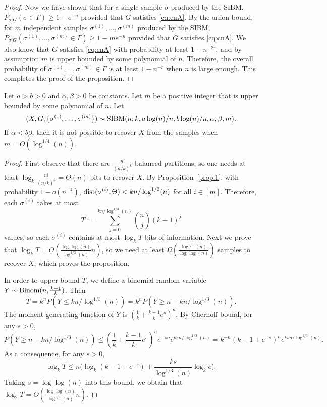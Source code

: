\documentclass{article}
\begin{document}
\begin{proof}
Now we have shown that for a single sample $\sigma$ produced by the SIBM, $P_{\sigma|G}(\sigma\in\Gamma)\ge 1- e^{-n}$ provided that $G$ satisfies \eqref{eq:cnA}. By the union bound, for $m$ independent samples $\sigma^{(1)},\dots,\sigma^{(m)}$ produced by the SIBM, $P_{\sigma|G}(\sigma^{(1)},\dots,\sigma^{(m)}\in\Gamma)\ge 1- m e^{-n}$ provided that $G$ satisfies \eqref{eq:cnA}.
We also know that $G$ satisfies \eqref{eq:cnA} with probability at least $1-n^{-2r}$, and by assumption $m$ is upper bounded by some polynomial of $n$. Therefore, the overall probability of $\sigma^{(1)},\dots,\sigma^{(m)}\in\Gamma$ is at least $1-n^{-r}$ when $n$ is large enough. This completes the proof of the proposition.
\end{proof}
\begin{proposition}  \label{prop:ab}
Let $a>b>0$ and $\alpha,\beta>0$ be constants. Let $m$ be a positive integer that is upper bounded by some polynomial of $n$.
Let 
$$
(X,G,\{\sigma^{(1)},\dots,\sigma^{(m)}\})\sim \operatorname{SIBM}(n,k, a\log(n)/n, b\log(n)/n,\alpha,\beta, m) .
$$
If $\alpha<b\beta$, then it is not possible to recover $X$ from the samples when $m=O(\log^{1/4}(n))$.
\end{proposition}

\begin{proof}
First observe that there are $\frac{n!}{(n/k)^k}$ balanced partitions, so one needs at least $\log_k \frac{n!}{(n/k)^k}=\Theta(n)$ bits to recover $X$.
By Proposition~\ref{prop:1}, with probability $1-o(n^{-4})$, $\operatorname{dist}(\sigma^{(i)}, \Theta)< kn/\log^{1/3}(n)$
for all $i\in[m]$. Therefore, each $\sigma^{(i)}$ takes at most
$$
T:=\sum_{j=0}^{kn/\log^{1/3}(n)} \binom{n}{j}(k-1)^j
$$
values, so each $\sigma^{(i)}$ contains at most $\log_k T$ bits of information. Next we prove that $\log_k T=O(\frac{\log\log(n)}{\log^{1/3}(n)} n)$, so we need at least $\Omega(\frac{\log^{1/3}(n)}{\log\log(n)})$ samples to recover $X$, which proves the proposition.

In order to upper bound $T$, we define a binomial random variable $Y\sim\operatorname{Binom}(n,\frac{k-1}{k})$. Then
$$
T=k^n P(Y\le kn/\log^{1/3}(n))
= k^n P(Y\ge n- kn/\log^{1/3}(n)).
$$
The moment generating function of $Y$ is $(\frac{1}{k}+\frac{k-1}{k}e^s)^n$. By Chernoff bound, for any $s>0$,
$$
P(Y\ge n- kn/\log^{1/3}(n)) \le
(\frac{1}{k}+\frac{k-1}{k}e^s)^n e^{-sn}
e^{ksn/\log^{1/3}(n)}
= k^{-n} (k-1+e^{-s})^n e^{ksn/\log^{1/3}(n)} .
$$
As a consequence, for any $s>0$,
$$
\log_k T\le n\Big(\log_k(k-1+e^{-s})
+\frac{ks}{\log^{1/3}(n)}\log_k e \Big) .
$$
Taking $s=\log\log(n)$ into this bound, we obtain that $\log_2 T=O(\frac{\log\log(n)}{\log^{1/3}(n)} n)$.
\end{proof}
\end{document}
